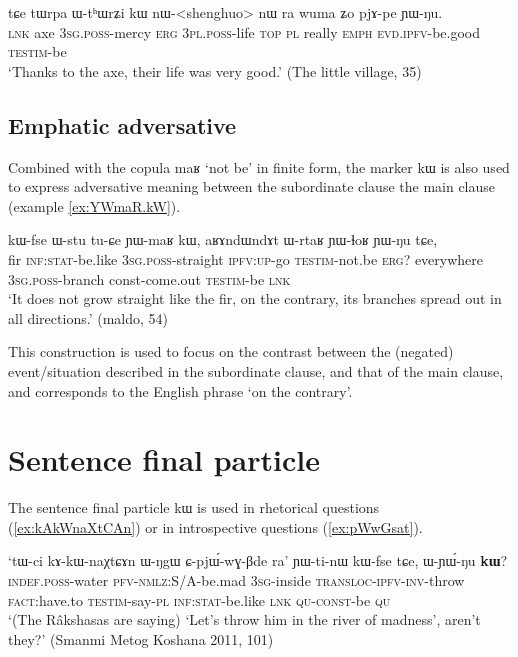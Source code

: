 \documentclass[oldfontcommands,oneside,a4paper,11pt]{article}
\newcommand{\ipa}[1]{{\phon #1}} %
\begin{document}
  \begin{exe}
\ex \label{ex:WthWrZi.kW}
\gll
\ipa{tɕe}  	\ipa{tɯrpa}  	\ipa{ɯ-tʰɯrʑi}  	\ipa{kɯ}  	\ipa{nɯ}-<shenghuo>  	\ipa{nɯ} \ipa{ra}  	\ipa{wuma}  	\ipa{ʑo}  	\ipa{pjɤ-pe}  	\ipa{ɲɯ-ŋu.}  \\
\textsc{lnk} axe \textsc{3sg.poss}-mercy \textsc{erg} \textsc{3pl.poss}-life \textsc{top} \textsc{pl} really \textsc{emph} \textsc{evd.ipfv}-be.good \textsc{testim}-be \\
\glt `Thanks to the axe, their life was very good.' (The little village, 35)
  \end{exe}
  
  
 \subsection{Emphatic adversative} \label{sec:advers}
Combined with the copula \ipa{maʁ} `not be' in finite form, the marker \ipa{kɯ} is also used to express adversative meaning between the subordinate clause the main clause (example \ref{ex:YWmaR.kW}).
 
  \begin{exe} 
 \ex \label{ex:YWmaR.kW}
\gll \ipa{tɯrgi} 	\ipa{kɯ-fse} 	\ipa{ɯ-stu} 	\ipa{tu-ɕe} 	\ipa{ɲɯ-maʁ} 	\ipa{kɯ,} \ipa{aʁɤndɯndɤt} 	\ipa{ɯ-rtaʁ} 	\ipa{ɲɯ-ɬoʁ} 	\ipa{ɲɯ-ŋu} 	\ipa{tɕe,} 
\\
fir \textsc{inf:stat}-be.like \textsc{3sg.poss}-straight \textsc{ipfv:up}-go \textsc{testim}-not.be \textsc{erg}? everywhere \textsc{3sg.poss}-branch const-come.out \textsc{testim}-be \textsc{lnk} \\ 
\glt `It does not grow straight like the fir, on the contrary, its branches spread out in all directions.'  
(maldo, 54)
 \end{exe}  
 
 This construction is used to focus on the contrast between the (negated) event/situation described in the subordinate clause, and that of the main clause, and corresponds to the English phrase `on the contrary'.
 
 \section{Sentence final particle} \label{sec:compl}
 
 
The sentence final particle \ipa{kɯ} is used in rhetorical questions (\ref{ex:kAkWnaXtCAn}) or in introspective questions (\ref{ex:pWwGsat}).
 \begin{exe} 
 \ex \label{ex:kAkWnaXtCAn}
\gll 
`\ipa{tɯ-ci} 	\ipa{kɤ-kɯ-naχtɕɤn} 	\ipa{ɯ-ŋgɯ} 	\ipa{ɕ-pjɯ́-wɣ-βde} 	\ipa{ra}' 	\ipa{ɲɯ-ti-nɯ} 	\ipa{kɯ-fse} 	\ipa{tɕe,} 	\ipa{ɯ-ɲɯ́-ŋu} 	\ipa{\textbf{kɯ}?} \\
\textsc{indef.poss}-water \textsc{pfv-nmlz}:S/A-be.mad \textsc{3sg}-inside \textsc{transloc-ipfv-inv}-throw \textsc{fact}:have.to \textsc{testim}-say-\textsc{pl} \textsc{inf:stat}-be.like \textsc{lnk} \textsc{qu-const}-be \textsc{qu} \\
\glt `(The Râkshasas are saying)  `Let's throw him in the river of madness', aren't they?' (Smanmi Metog Koshana 2011, 101)
\end{exe} 
 
\end{document}
